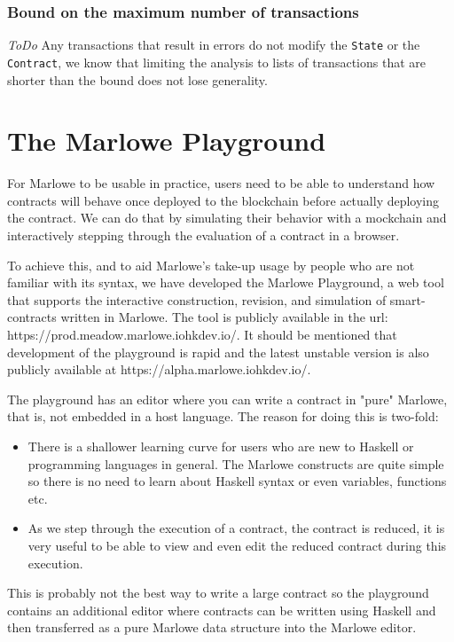\documentclass[runningheads]{llncs}
\begin{document}
\subsubsection{Bound on the maximum number of transactions\label{subsubsec:bound_max_transaction_number}}

\emph{ToDo}
Any transactions that result in errors do not modify the \texttt{State} or the \texttt{Contract}, we know that limiting the analysis to lists of transactions that are shorter than the bound does not lose generality.


\clearpage
\section{The Marlowe Playground}

For Marlowe to be usable in practice, users need to be able to understand how contracts will behave once deployed to the blockchain before actually deploying the contract. We can do that by simulating their behavior with a mockchain and interactively stepping through the evaluation of a contract in a browser.

To achieve this, and to aid Marlowe’s take-up usage by people who are not familiar with its syntax, we have developed the Marlowe Playground, a web tool that supports the interactive construction, revision, and simulation of smart-contracts written in Marlowe. The tool is publicly available in the url: https://prod.meadow.marlowe.iohkdev.io/. It should be mentioned that development of the playground is rapid and the latest unstable version is also publicly available at https://alpha.marlowe.iohkdev.io/.

The playground has an editor where you can write a contract in "pure" Marlowe, that is, not embedded in a host language. The reason for doing this is two-fold:
\begin{itemize}
    \item There is a shallower learning curve for users who are new to Haskell or programming languages in general. The Marlowe constructs are quite simple so there is no need to learn about Haskell syntax or even variables, functions etc.
    \item As we step through the execution of a contract, the contract is reduced, it is very useful to be able to view and even edit the reduced contract during this execution.
\end{itemize}
This is probably not the best way to write a large contract so the playground contains an additional editor where contracts can be written using Haskell and then transferred as a pure Marlowe data structure into the Marlowe editor.
\end{document}
